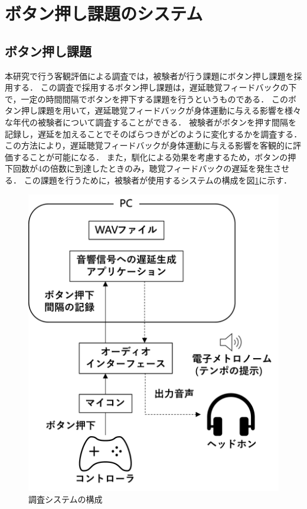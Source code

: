 \section{ボタン押し課題のシステム}
\subsection{ボタン押し課題}
本研究で行う客観評価による調査では，被験者が行う課題にボタン押し課題を採用する．
この調査で採用するボタン押し課題は，遅延聴覚フィードバックの下で，一定の時間間隔でボタンを押下する課題を行うというものである．
このボタン押し課題を用いて，遅延聴覚フィードバックが身体運動に与える影響を様々な年代の被験者について調査することができる．
被験者がボタンを押す間隔を記録し，遅延を加えることでそのばらつきがどのように変化するかを調査する．
この方法により，遅延聴覚フィードバックが身体運動に与える影響を客観的に評価することが可能になる．
また，馴化による効果を考慮するため，ボタンの押下回数が4の倍数に到達したときのみ，聴覚フィードバックの遅延を発生させる．
この課題を行うために，被験者が使用するシステムの構成を図\ref{fig:button-click-system}に示す．
\begin{figure}[tb]
  \centering
  \includegraphics[scale=0.15]{figures/system_button_click.pdf}
  \caption{調査システムの構成}
  \label{fig:button-click-system}
\end{figure}
